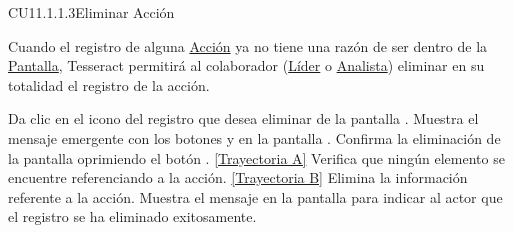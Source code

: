 	\begin{UseCase}{CU11.1.1.3}{Eliminar Acción}{
			
				Cuando el registro de alguna \hyperlink{EntidadAccion}{Acción} ya no tiene una razón de ser dentro de la \hyperlink{pantalla}{Pantalla}, Tesseract permitirá al colaborador (\hyperlink{jefe}{Líder} o \hyperlink{analista}{Analista}) eliminar en su totalidad el registro de la acción. \\

}
	\end{UseCase}
	\begin{UCtrayectoria}
		\UCpaso[\UCactor] Da clic en el icono \eliminar del registro que desea eliminar de la pantalla .
		\UCpaso[\UCsist] Muestra el mensaje emergente  con los botones  y  en la pantalla .
		\UCpaso[\UCactor] Confirma la eliminación de la pantalla oprimiendo el botón . \hyperlink{CU11-1-1-3:TAA}{[Trayectoria A]}
		\UCpaso[\UCsist] Verifica que ningún elemento se encuentre referenciando a la acción. \hyperlink{CU11-1-1-3:TAB}{[Trayectoria B]}
		\UCpaso[\UCsist] Elimina la información referente a la acción.
		\UCpaso[\UCsist] Muestra el mensaje  en la pantalla  para indicar al actor que el registro se ha eliminado exitosamente.
	\end{UCtrayectoria}		
